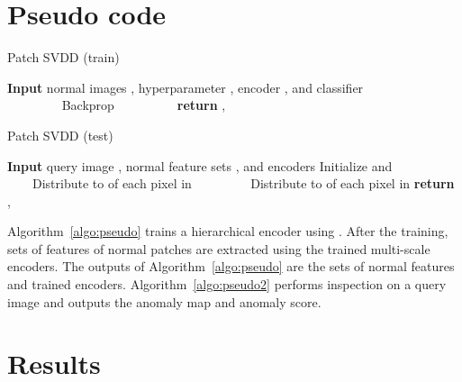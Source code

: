 \documentclass[runningheads]{llncs}
\begin{document}
\section{Pseudo code} \label{sec:appendix_pseudo_code}
\begin{algorithm}[H]
\caption{Patch SVDD (train)}
  \label{algo:pseudo}
  \begin{algorithmic}[1]
  \State \textbf{Input} normal images , hyperparameter , encoder , and classifier 
     
  \ \ \ \ \State  
  \ \ \ \ \State 
  \ \ \ \ \State   {}
  \ \ \ \ \State 
  \ \ \ \ \State Backprop   
  \EndFor
  \State    {}
  \State    {}
     
  \ \ \ \ \State 
  \EndFor
     
  \ \ \ \ \State 
  \EndFor
  \State \textbf{return} ,   
  \end{algorithmic}
\end{algorithm}
 \begin{algorithm}[H]
\caption{Patch SVDD (test)}
  \label{algo:pseudo2}
  \begin{algorithmic}[1]
  \State \textbf{Input} query image , normal feature sets , and encoders 
  \State Initialize  and 
         
  \ \ \ \ \State   {}
  \ \ \ \ \State Distribute  to  of each pixel in 
  \EndFor
         
  \ \ \ \ \State   {}
  \ \ \ \ \State Distribute  to  of each pixel in 
  \EndFor
  \State  {}
  \State  {}
  \State \textbf{return} ,   
  \end{algorithmic}
\end{algorithm}
 Algorithm~\ref{algo:pseudo} trains a hierarchical encoder using .
After the training, sets of features of normal patches are extracted using the trained multi-scale encoders.
The outputs of Algorithm~\ref{algo:pseudo} are the sets of normal features and trained encoders.
Algorithm~\ref{algo:pseudo2} performs inspection on a query image and outputs the anomaly map and anomaly score.
\newpage


\section{Results}
\end{document}
